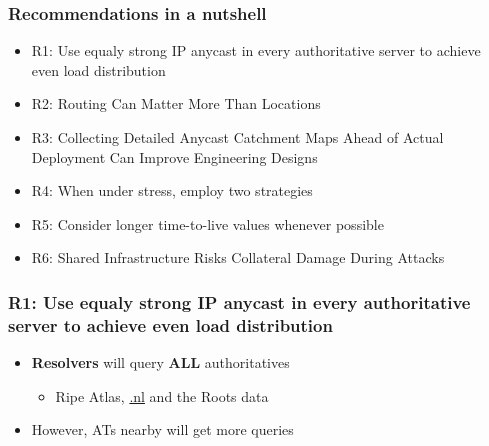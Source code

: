 \documentclass[11pt,show 
notes,notheorems,noamsthm,blank]{beamer} %
\begin{document}
\begin{frame}
 \frametitle{Recommendations in a nutshell}
 
 \begin{itemize}
  \item R1: Use equaly strong IP anycast in every authoritative server to
    achieve even load distribution~\cite{Mueller17b}
    
  \item R2:  Routing Can Matter More Than Locations~\cite{Schmidt17a}
  
  \item R3: Collecting Detailed Anycast Catchment Maps Ahead of Actual
    Deployment Can Improve Engineering Designs~\cite{Vries17b}
    
  \item R4:    When under stress, employ two strategies~\cite{Moura16b}
  
  \item R5:  Consider longer time-to-live values whenever 
possible~\cite{Moura18b}
  
    \item R6:  Shared Infrastructure Risks Collateral Damage During 
Attacks~\cite{Moura16b}
    


  

 \end{itemize}

\end{frame}


\begin{frame}
 \frametitle{R1: Use equaly strong IP anycast in every authoritative server to
    achieve even load distribution}
    
    
    
\begin{figure}
\centering

  
  \label{fig:nl-deployment}

\end{figure}
\vspace{-0.5cm}
\begin{itemize}
\item \textbf{Resolvers} will query \textbf{ALL} 
authoritatives~\cite{Mueller17b}
\begin{itemize}
 \item Ripe Atlas, \url{.nl} and the Roots data
\end{itemize}

\item However, ATs nearby will get more queries


\end{itemize}



\end{frame}
\end{document}
